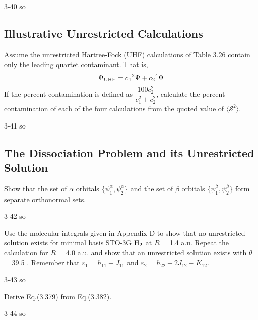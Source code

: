 \documentclass[a4paper]{book}
\begin{document}
	\begin{solution}
		3-40 so
	\end{solution}
	
	\subsection{Illustrative Unrestricted Calculations}
	
	\begin{exercise}
	Assume the unrestricted Hartree-Fock (UHF) calculations of Table 3.26 contain only the leading quartet contaminant. That is,
	\[
	 	\Psi_{\rm UHF} = c_1 {}^{2} \Psi + c_2 {}^{4} \Psi 
	\]
	If the percent contamination is defined as $\dfrac{ 100 c^2_2 }{ c^2_1 + c^2_2 }$, calculate the percent contamination of each of the four calculations from the quoted value of $\langle \mathscr{S}^2 \rangle$.
	\end{exercise}
	
	\begin{solution}
		3-41 so
	\end{solution}
	
	\subsection{The Dissociation Problem and its Unrestricted Solution}
	
	\begin{exercise}
	Show that the set of $\alpha$ orbitals $\{ \psi^\alpha_1 , \psi^\alpha_2 \}$ and the set of $\beta$ orbitals $\{ \psi^\beta_1 , \psi^\beta_2 \}$ form separate orthonormal sets.
	\end{exercise}
	
	\begin{solution}
		3-42 so
	\end{solution}
	
	\begin{exercise}
	Use the molecular integrals given in Appendix D to show that no unrestricted solution exists for minimal basis STO-3G $\ce{H2}$ at $R$ = 1.4 a.u. Repeat the calculation for $R$ = 4.0 a.u. and show that an unrestricted solution exists with $\theta$ = 39.5${}^\circ$. Remember that $\varepsilon_1 = h_{11} + J_{11}$ and $\varepsilon_2 = h_{22} + 2 J_{12} - K_{12}$.
	\end{exercise}
	
	\begin{solution}
		3-43 so
	\end{solution}
	
	\begin{exercise}
	Derive Eq.(3.379) from Eq.(3.382).
	\end{exercise}
	
	\begin{solution}
		3-44 so
	\end{solution}
\end{document}

